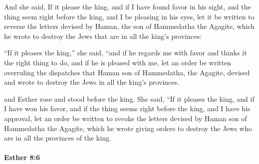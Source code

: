 			\begin{versebox}
					\item[BHS] 
					\item[LXX] 
					\item[ASV] And she said, If it please the king, and if I have found favor in his sight, and the thing seem right before the king, and I be pleasing in his eyes, let it be written to reverse the letters devised by Haman, the son of Hammedatha the Agagite, which he wrote to destroy the Jews that are in all the king's provinces:
					\item[NIV] “If it pleases the king,” she said, “and if he regards me with favor and thinks it the right thing to do, and if he is pleased with me, let an order be written overruling the dispatches that Haman son of Hammedatha, the Agagite, devised and wrote to destroy the Jews in all the king’s provinces.
					\item[NRSV] and Esther rose and stood before the king. She said, “If it pleases the king, and if I have won his favor, and if the thing seems right before the king, and I have his approval, let an order be written to revoke the letters devised by Haman son of Hammedatha the Agagite, which he wrote giving orders to destroy the Jews who are in all the provinces of the king.
			\end{versebox}

		\paragraph{Esther 8:6} %
			\label{ESTHER-8-6}

